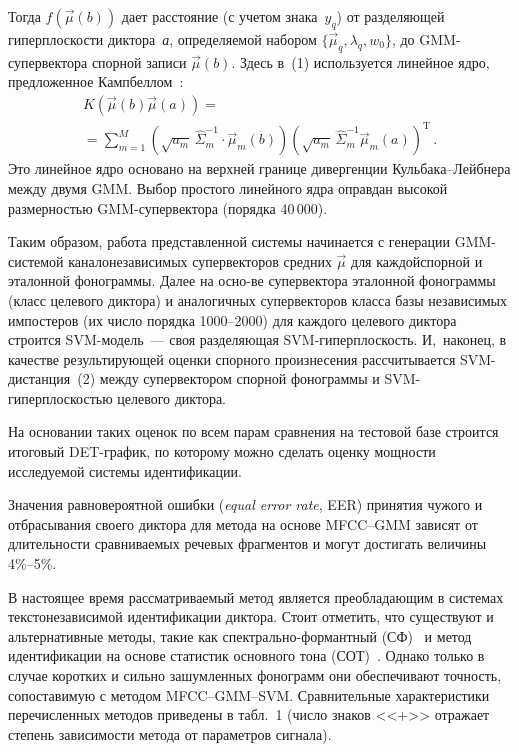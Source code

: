 \begin{multicols}{2}
  Тогда $f(\vec{\mu}(b))$ дает расстояние (с учетом знака~$y_q$) от 
разделяющей гиперплоскости диктора~\textit{а}, определяемой набором 
$\{\vec{\mu}_q,\lambda_q,w_0\}$, до GMM-су\-пер\-век\-то\-ра спорной записи 
$\vec{\mu}(b)$. Здесь в~(1) используется линейное ядро, предложенное 
Кампбеллом~\cite{10b}:
  \begin{multline*}
  K(\vec{\mu}(b)\vec{\mu}(a))={}\\
  {}=\sum\limits_{m=1}^M \left( \sqrt{a_m}\,
  \hat{\Sigma}_m^{-1} \cdot \vec{\mu}_m(b)\right) \left( 
\sqrt{a_m}\,\hat{\Sigma}_m^{-1}\vec{\mu}_m(a)\right)^{\mathrm{T}}\,.
  \end{multline*}
  Это линейное ядро основано на верхней границе дивергенции 
  Куль\-ба\-ка--Лейб\-не\-ра между двумя GMM. Выбор простого линейного 
ядра оправдан высокой размерностью GMM-су\-пер\-век\-то\-ра (порядка 
40\,000).
  
  Таким образом, работа представленной системы начинается с генерации 
GMM-сис\-те\-мой каналонезависимых супервекторов средних $\vec{\mu}$ 
для каждой\linebreak спорной и эталонной фонограммы. Далее на осно-\linebreak ве супервектора 
эталонной фонограммы (класс\linebreak
 целевого диктора) и аналогичных супервекторов 
класса базы независимых импостеров (их число порядка 1000--2000) для каждого 
целевого диктора строится SVM-мо\-дель~--- своя разделяющая 
SVM-ги\-пер\-плос\-кость. И,~наконец, в качестве ре\-зуль\-ти\-ру\-ющей оценки 
спорного произнесения рассчитывается SVM-дис\-тан\-ция~(2) между 
супервектором спорной фонограммы и SVM-ги\-пер\-плос\-костью целевого 
диктора.
  
  На основании таких оценок по всем парам сравнения на тестовой базе строится 
итоговый DET-гра\-фик, по которому можно сделать оценку мощности 
исследуемой системы идентификации.
  
  Значения равновероятной ошибки (\textit{equal error rate}, EER) принятия чужого и 
отбрасывания своего диктора для метода на основе MFCC--GMM зависят от 
длительности сравниваемых речевых фрагментов и могут достигать величины 
4\%--5\%.
  
  В настоящее время рассматриваемый метод является преобладающим в 
системах текстонезависимой идентификации диктора. Стоит отметить, что 
существуют и альтернативные методы, такие как спект\-раль\-но-фор\-мант\-ный 
(СФ)~\cite{11b} и метод идентификации на основе статистик основного тона 
(СОТ)~\cite{12b}. Однако только в случае коротких и сильно зашумленных 
фонограмм они обеспечивают точность, сопоставимую с методом 
MFCC--GMM--SVM. Сравнительные характеристики перечисленных 
методов приведены в табл.~1 (число знаков <<$+$>> отражает степень 
зависимости метода от параметров сигнала).


\end{multicols}
